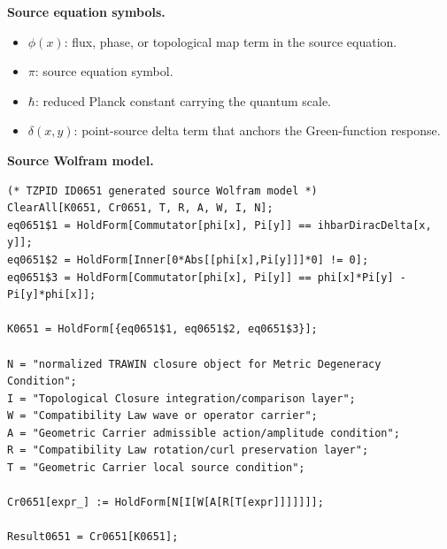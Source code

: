 \begin{minipage}[t]{0.49\linewidth}
\begingroup
\small
\raggedright
\textbf{Source equation symbols.}\par
\begin{itemize}[leftmargin=1.35em,itemsep=1pt,topsep=1pt,parsep=0pt]
    \item $\phi(x)$: flux, phase, or topological map term in the source equation.
    \item $\pi$: source equation symbol.
    \item $\hbar$: reduced Planck constant carrying the quantum scale.
    \item $\delta(x,y)$: point-source delta term that anchors the Green-function response.
\end{itemize}
\endgroup
\end{minipage}\hfill
\begin{minipage}[t]{0.47\linewidth}
\begingroup
\scriptsize
\raggedright
\textbf{Source Wolfram model.}\par
\begin{Verbatim}[fontsize=\tiny,breaklines=true,breakanywhere=true]
(* TZPID ID0651 generated source Wolfram model *)
ClearAll[K0651, Cr0651, T, R, A, W, I, N];
eq0651$1 = HoldForm[Commutator[phi[x], Pi[y]] == ihbarDiracDelta[x, y]];
eq0651$2 = HoldForm[Inner[0*Abs[[phi[x],Pi[y]]]*0] != 0];
eq0651$3 = HoldForm[Commutator[phi[x], Pi[y]] == phi[x]*Pi[y] - Pi[y]*phi[x]];

K0651 = HoldForm[{eq0651$1, eq0651$2, eq0651$3}];

N = "normalized TRAWIN closure object for Metric Degeneracy Condition";
I = "Topological Closure integration/comparison layer";
W = "Compatibility Law wave or operator carrier";
A = "Geometric Carrier admissible action/amplitude condition";
R = "Compatibility Law rotation/curl preservation layer";
T = "Geometric Carrier local source condition";

Cr0651[expr_] := HoldForm[N[I[W[A[R[T[expr]]]]]]];

Result0651 = Cr0651[K0651];
\end{Verbatim}
\endgroup
\end{minipage}

